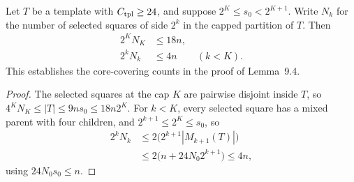 \begin{lemma}
    \label{thm:area_law_template_core_selected_count}
    \leanok
    Let $T$ be a template with $C_{\rm tpl}\ge24$, and suppose
    $2^K\le s_0<2^{K+1}$. Write $N_k$ for the number of selected squares
    of side $2^k$ in the capped partition of $T$. Then
    \begin{align}
        2^K N_K & \le18n,             \\
        2^k N_k & \le4n \qquad (k<K).
    \end{align}
    This establishes the core-covering counts in the proof of Lemma~9.4.
\end{lemma}
\begin{proof}\leanok
    The selected squares at the cap $K$ are pairwise disjoint inside $T$, so
    $4^K N_K\le |T|\le9ns_0\le18n2^K$.
    For $k<K$, every selected square has a mixed parent with four children, and
    $2^{k+1}\le2^K\le s_0$, so
    \begin{align}
        2^k N_k
         & \le2\bigl(2^{k+1}|M_{k+1}(T)|\bigr)   \\
         & \le2\bigl(n+24N_0 2^{k+1}\bigr)\le4n,
    \end{align}
    using $24N_0s_0\le n$.
\end{proof}
